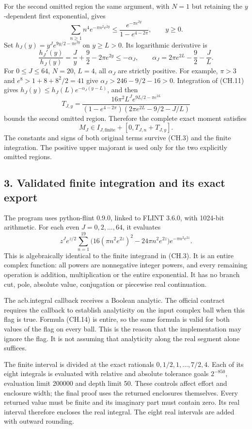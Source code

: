 For the second omitted region the same argument, with \(N=1\) but retaining the \(y\)-dependent first exponential, gives \[
 \sum_{n\ge1}n^4e^{-\pi n^2e^{2y}}
 \le
 \frac{e^{-\pi e^{2y}}}{1-e^{4-2\pi}},
 \qquad y\ge0 .
\tag{CH.10}
\] Set \(h_J(y)=y^Je^{9y/2-\pi e^{2y}}\) on \(y\ge L>0\). Its logarithmic derivative is \[
 \frac{h_J'(y)}{h_J(y)}
 =\frac Jy+\frac92-2\pi e^{2y}
 \le-\alpha_J,\qquad
 \alpha_J=2\pi e^{2L}-\frac92-\frac JL .
\tag{CH.11}
\] For \(0\le J\le64\), \(N=20\), \(L=4\), all \(\alpha_J\) are strictly positive. For example, \(\pi>3\) and \(e^8>1+8+8^2/2=41\) give \(\alpha_J>246-9/2-16>0\). Integration of (CH.11) gives \(h_J(y)\le h_J(L)e^{-\alpha_J(y-L)}\), and then \[
 T_{J,y}=
 \frac{16\pi^2 L^J e^{9L/2-\pi e^{2L}}}
 {(1-e^{4-2\pi})(2\pi e^{2L}-9/2-J/L)}
\tag{CH.12}
\] bounds the second omitted region. Therefore the complete exact moment satisfies \[
 M_J\in I_{J,\mathrm{finite}}+[0,T_{J,n}+T_{J,y}].
\tag{CH.13}
\] The constants and signs of both original terms survive (CH.3) and the finite integration. The positive upper majorant is used only for the two explicitly omitted regions.

\subsection{3. Validated finite integration and its exact export}\label{C47stage:CH:validated-finite-integration-and-its-exact-export}

The program uses python-flint 0.9.0, linked to FLINT 3.6.0, with 1024-bit arithmetic. For each even \(J=0,2,\ldots,64\), it evaluates \[
 z^J e^{z/2}\sum_{n=1}^{19}
 \bigl(16(\pi n^2e^{2z})^2-24\pi n^2e^{2z}\bigr)
 e^{-\pi n^2e^{2z}}.
\tag{CH.14}
\] This is algebraically identical to the finite integrand in (CH.3). It is an entire complex function: all powers are nonnegative integer powers, and every remaining operation is addition, multiplication or the entire exponential. It has no branch cut, pole, absolute value, conjugation or piecewise real continuation.

The acb.integral callback receives a Boolean analytic. The official contract requires the callback to establish analyticity on the input complex ball when this flag is true. Formula (CH.14) is entire, so the same formula is valid for both values of the flag on every ball. This is the reason that the implementation may ignore the flag. It is not assuming that analyticity along the real segment alone suffices.

The finite interval is divided at the exact rationals \(0,1/2,1,\ldots,7/2,4\). Each of its eight integrals is evaluated with relative and absolute tolerance goals \(2^{-850}\), evaluation limit 200000 and depth limit 50. These controls affect effort and enclosure width; the final proof uses the returned enclosures themselves. Every returned value must be finite and its imaginary part must contain zero. Its real interval therefore encloses the real integral. The eight real intervals are added with outward rounding.

